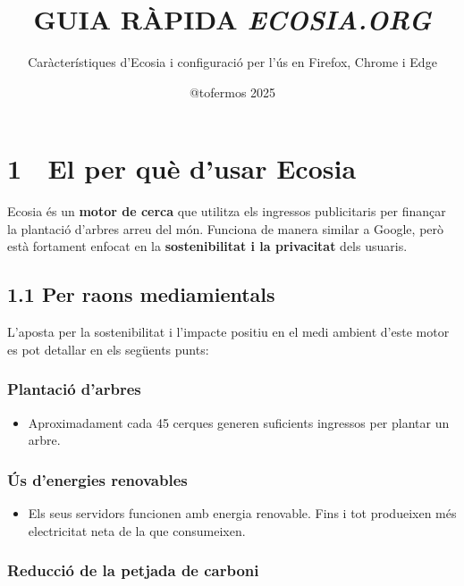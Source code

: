 \documentclass[
  a4paper,
]{article}
\title{GUIA RÀPIDA \emph{ECOSIA.ORG}}
\subtitle{Caràcterístiques d'Ecosia i configuració per l'ús en Firefox,
Chrome i Edge}
\author{@tofermos 2025}
\date{}
\providecommand{\tightlist}{%
  \setlength{\itemsep}{0pt}\setlength{\parskip}{0pt}}
\begin{document}
\maketitle

{
\setcounter{tocdepth}{2}
\tableofcontents
}
\newpage
\renewcommand\tablename{Tabla}

\section{1 🌱 El per què d'usar
Ecosia}\label{el-per-quuxe8-dusar-ecosia}

Ecosia és un \textbf{motor de cerca} que utilitza els ingressos
publicitaris per finançar la plantació d'arbres arreu del món. Funciona
de manera similar a Google, però està fortament enfocat en la
\textbf{sostenibilitat i la privacitat} dels usuaris.

\subsection{1.1 Per raons mediamientals}\label{per-raons-mediamientals}

L'aposta per la sostenibilitat i l'impacte positiu en el medi ambient
d'este motor es pot detallar en els següents punts:

\subsubsection{Plantació d'arbres}\label{plantaciuxf3-darbres}

\begin{itemize}
\tightlist
\item
  Aproximadament cada 45 cerques generen suficients ingressos per
  plantar un arbre.
\end{itemize}

\subsubsection{Ús d'energies
renovables}\label{uxfas-denergies-renovables}

\begin{itemize}
\tightlist
\item
  Els seus servidors funcionen amb energia renovable. Fins i tot
  produeixen més electricitat neta de la que consumeixen.
\end{itemize}

\subsubsection{Reducció de la petjada de
carboni}\label{reducciuxf3-de-la-petjada-de-carboni}
\end{document}
